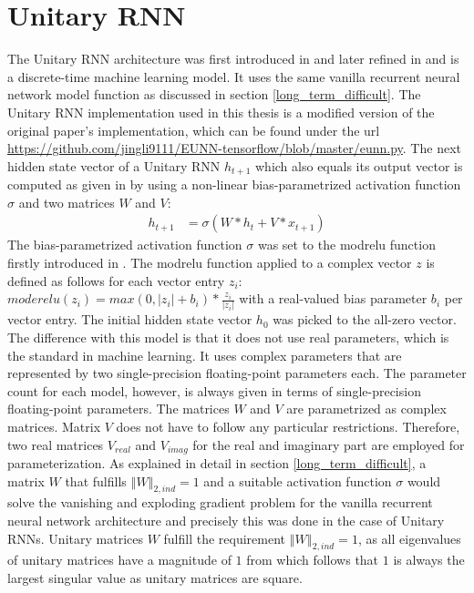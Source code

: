 \documentclass[draft,final]{vutinfth} %
\begin{document}
    \section{Unitary RNN} \label{urnn}
    The Unitary RNN architecture was first introduced in \cite{UnitaryRNNs} and later refined in \cite{EfficientUnitaryRNNs} and is a discrete-time machine learning model.
    It uses the same vanilla recurrent neural network model function as discussed in section \ref{long_term_difficult}.
    The Unitary RNN implementation used in this thesis is a modified version of the original paper's implementation, which can be found under the url \url{https://github.com/jingli9111/EUNN-tensorflow/blob/master/eunn.py}.
    The next hidden state vector of a Unitary RNN $h_{t+1}$ which also equals its output vector is computed as given in \cite[p. 2]{EfficientUnitaryRNNs} by using a non-linear bias-parametrized activation function $\sigma$ and two matrices $W$ and $V$:
    \begin{align}
        \label{urnn_state}
        h_{t+1} &= \sigma(W*h_t + V*x_{t+1})
    \end{align}
    The bias-parametrized activation function $\sigma$ was set to the modrelu function firstly introduced in \cite[p. 4]{UnitaryRNNs}.
    The modrelu function applied to a complex vector $z$ is defined as follows for each vector entry $z_i$: $moderelu(z_i) = max(0, |z_i|+b_i) * \frac{z_i}{|z_i|}$ with a real-valued bias parameter $b_i$ per vector entry.
    The initial hidden state vector $h_0$ was picked to the all-zero vector.
    The difference with this model is that it does not use real parameters, which is the standard in machine learning.
    It uses complex parameters that are represented by two single-precision floating-point parameters each.
    The parameter count for each model, however, is always given in terms of single-precision floating-point parameters.
    The matrices $W$ and $V$ are parametrized as complex matrices.
    Matrix $V$ does not have to follow any particular restrictions. Therefore, two real matrices $V_{real}$ and $V_{imag}$ for the real and imaginary part are employed for parameterization.
    As explained in detail in section \ref{long_term_difficult}, a matrix $W$ that fulfills $\left\Vert W \right\Vert_{2,ind} = 1$ and a suitable activation function $\sigma$ would solve the vanishing and exploding gradient problem for the vanilla recurrent neural network architecture and precisely this was done in the case of Unitary RNNs.
    Unitary matrices $W$ fulfill the requirement $\left\Vert W \right\Vert_{2,ind} = 1$, as all eigenvalues of unitary matrices have a magnitude of $1$ from which follows that $1$ is always the largest singular value as unitary matrices are square.
\end{document}
